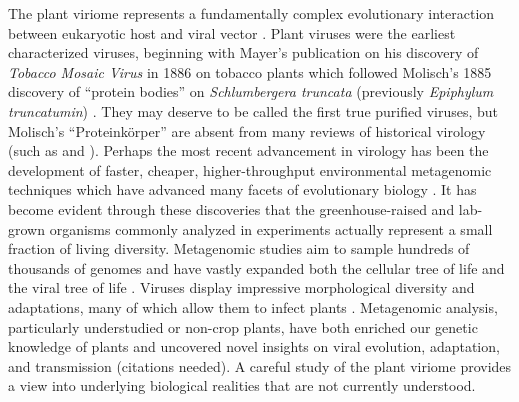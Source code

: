 \documentclass[11pt,letterpaper,titlepage]{article}
\begin{document}
\begin{linenumbers}
The plant viriome represents a fundamentally complex evolutionary interaction between eukaryotic host and viral vector \citep{delwart_viral_2007}. 
Plant viruses were the earliest characterized viruses, beginning with Mayer's publication on his discovery of \textit{Tobacco Mosaic Virus} in 1886 on tobacco plants \citep{mayer1886mosaikkrankheit} which followed Molisch's 1885 discovery of ``protein bodies'' on \textit{Schlumbergera truncata} (previously \textit{Epiphylum truncatumin}) \citep{molisch1885merkwurdige}.
They may deserve to be called the first true purified viruses, but Molisch's ``Proteinkörper'' are absent from many reviews of historical virology (such as \cite{LECOQ2001929} and \cite{lefeuvre_evolution_2019}).
Perhaps the most recent advancement in virology has been the development of faster, cheaper, higher-throughput environmental metagenomic techniques which have advanced many facets of evolutionary biology \citep{delwart_viral_2007,lefeuvre_evolution_2019,schulz_towards_2017}.
It has become evident through these discoveries that the greenhouse-raised and lab-grown organisms commonly analyzed in experiments actually represent a small fraction of living diversity. %
Metagenomic studies aim to sample hundreds of thousands of genomes and have vastly expanded both the cellular tree of life \citep{schulz_towards_2017,hug_new_2016} and the viral tree of life \citep{gregory_marine_2019,lefeuvre_evolution_2019,shi_redefining_2016}.
Viruses display impressive morphological diversity and adaptations, many of which allow them to infect plants \citep{delwart_viral_2007,lefeuvre_evolution_2019}.
Metagenomic analysis, particularly understudied or non-crop plants, have both enriched our genetic knowledge of plants and uncovered novel insights on viral evolution, adaptation, and transmission (citations needed).
A careful study of the plant viriome provides a view into underlying biological realities that are not currently understood.


\end{linenumbers}
\end{document}
